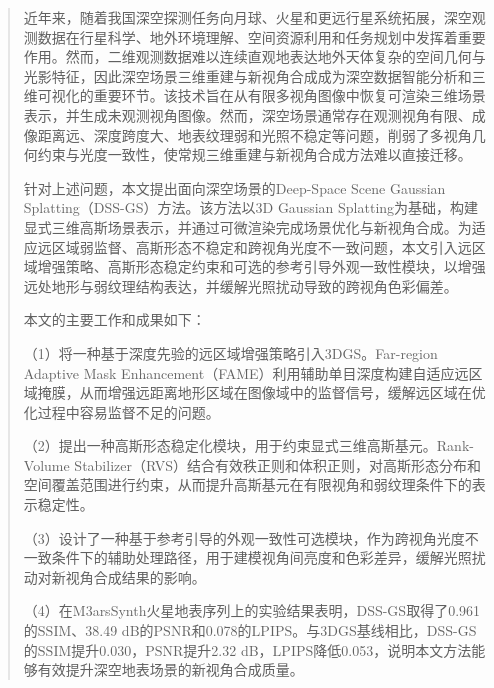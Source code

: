 
\begin{abstract}
    近年来，随着我国深空探测任务向月球、火星和更远行星系统拓展，深空观测数据在行星科学、地外环境理解、空间资源利用和任务规划中发挥着重要作用。然而，二维观测数据难以连续直观地表达地外天体复杂的空间几何与光影特征，因此深空场景三维重建与新视角合成成为深空数据智能分析和三维可视化的重要环节。该技术旨在从有限多视角图像中恢复可渲染三维场景表示，并生成未观测视角图像。然而，深空场景通常存在观测视角有限、成像距离远、深度跨度大、地表纹理弱和光照不稳定等问题，削弱了多视角几何约束与光度一致性，使常规三维重建与新视角合成方法难以直接迁移。

    针对上述问题，本文提出面向深空场景的Deep-Space Scene Gaussian Splatting（DSS-GS）方法。该方法以3D Gaussian Splatting为基础，构建显式三维高斯场景表示，并通过可微渲染完成场景优化与新视角合成。为适应远区域弱监督、高斯形态不稳定和跨视角光度不一致问题，本文引入远区域增强策略、高斯形态稳定约束和可选的参考引导外观一致性模块，以增强远处地形与弱纹理结构表达，并缓解光照扰动导致的跨视角色彩偏差。
        
    本文的主要工作和成果如下：

    （1）将一种基于深度先验的远区域增强策略引入3DGS。Far-region Adaptive Mask Enhancement（FAME）利用辅助单目深度构建自适应远区域掩膜，从而增强远距离地形区域在图像域中的监督信号，缓解远区域在优化过程中容易监督不足的问题。

    （2）提出一种高斯形态稳定化模块，用于约束显式三维高斯基元。Rank-Volume Stabilizer（RVS）结合有效秩正则和体积正则，对高斯形态分布和空间覆盖范围进行约束，从而提升高斯基元在有限视角和弱纹理条件下的表示稳定性。

    （3）设计了一种基于参考引导的外观一致性可选模块，作为跨视角光度不一致条件下的辅助处理路径，用于建模视角间亮度和色彩差异，缓解光照扰动对新视角合成结果的影响。

    （4）在M3arsSynth火星地表序列上的实验结果表明，DSS-GS取得了0.961的$\mathrm{SSIM}$、38.49 dB的$\mathrm{PSNR}$和0.078的$\mathrm{LPIPS}$。与3DGS基线相比，DSS-GS的$\mathrm{SSIM}$提升0.030，$\mathrm{PSNR}$提升2.32 dB，$\mathrm{LPIPS}$降低0.053，说明本文方法能够有效提升深空地表场景的新视角合成质量。

\end{abstract}

